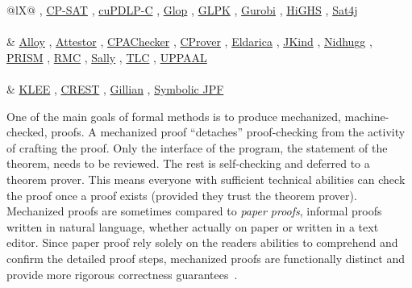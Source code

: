 \begin{table}[p!]
\begin{tabularx}{\linewidth}{@{}lX@{}}
,{ }\href{https://developers.google.com/optimization/cp/cp_solver}{CP-SAT}%
,{ }\href{https://github.com/COPT-Public/cuPDLP-C}{cuPDLP-C}%
,{ }\href{https://en.wikipedia.org/wiki/GLOP}{Glop}%
,{ }\href{https://www.gnu.org/software/glpk/}{GLPK}%
,{ }\href{https://en.wikipedia.org/wiki/Gurobi_Optimizer}{Gurobi}%
,{ }\href{https://github.com/ERGO-Code/HiGHS}{HiGHS}%
,{ }\href{https://sat4j.org}{Sat4j}%
\\\midrule
{} \\
&
\href{https://alloytools.org}{Alloy}%
,{ }\href{https://github.com/moves-rwth/attestor}{Attestor}%
,{ }\href{https://cpachecker.sosy-lab.org}{CPAChecker}%
,{ }\href{https://github.com/diffblue/cbmc}{CProver}%
,{ }\href{https://github.com/uuverifiers/eldarica}{Eldarica}%
,{ }\href{https://github.com/loonwerks/jkind}{JKind}%
,{ }\href{https://github.com/nidhugg/nidhugg}{Nidhugg}%
,{ }\href{https://www.prismmodelchecker.org}{PRISM}%
,{ }\href{https://rebeca-lang.org/alltools/RMC}{RMC}%
,{ }\href{https://sri-csl.github.io/sally/}{Sally}%
,{ }\href{https://github.com/tlaplus/tlaplus}{TLC}%
,{ }\href{https://uppaal.org}{\mbox{UPPAAL}}%
\\\midrule
{} \\
& 
\href{https://klee-se.org}{KLEE}%
,{ }\href{https://github.com/jburnim/crest}{CREST}%
,{ }\href{https://github.com/GillianPlatform/Gillian}{Gillian}%
,{ }\href{https://github.com/SymbolicPathFinder/jpf-symbc}{Symbolic JPF}
\\
\bottomrule
\caption[Tools for formal methods]{A categorized collection of formal methods tools.}
\label{tab:fm-tools}
\end{tabularx}
\end{table}

One of the main goals of formal methods is to produce mechanized, \ie machine-checked, proofs.
A mechanized proof \enquote{detaches} proof-checking from the activity of crafting the proof.
Only the interface of the program, \ie the statement of the theorem, needs to be reviewed.
The rest is self-checking and deferred to a theorem prover.
This means everyone with sufficient technical abilities can check the proof once a proof exists (provided they trust the theorem prover).
Mechanized proofs are sometimes compared to \emph{paper proofs}, \ie informal proofs written in natural language, whether actually on paper or written in a text editor.
Since paper proof rely solely on the readers abilities to comprehend and confirm the detailed proof steps, mechanized proofs are functionally distinct and provide more rigorous correctness guarantees~\cite{gonthier2008}.

